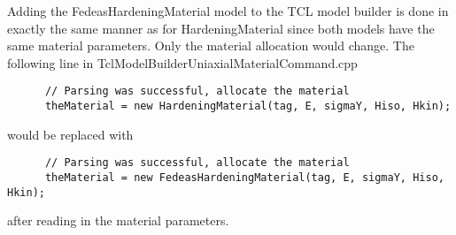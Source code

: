 \documentclass[12pt]{article}
\begin{document}
Adding the FedeasHardeningMaterial model to the TCL model builder is done in exactly the same
manner as for HardeningMaterial since both models have the same material parameters. Only the
material allocation would change. The following line in TclModelBuilderUniaxialMaterialCommand.cpp

{\sf\small
\begin{verbatim}
      // Parsing was successful, allocate the material
      theMaterial = new HardeningMaterial(tag, E, sigmaY, Hiso, Hkin); 
\end{verbatim}
}

\noindent would be replaced with

{\sf\small
\begin{verbatim}
      // Parsing was successful, allocate the material
      theMaterial = new FedeasHardeningMaterial(tag, E, sigmaY, Hiso, Hkin); 
\end{verbatim}
}

\noindent after reading in the material parameters.
\end{document}
